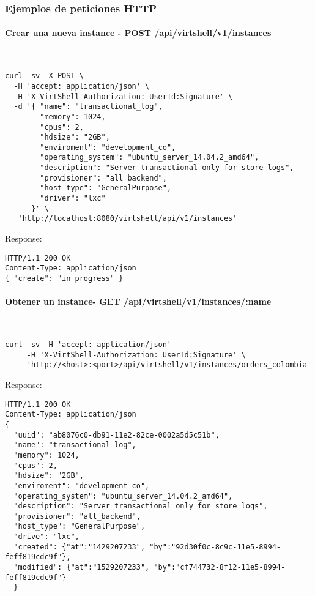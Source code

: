 \subsubsection{Ejemplos de peticiones HTTP}

\paragraph{Crear una nueva instance - POST /api/virtshell/v1/instances} ~\\


\begin{lstlisting}[style=json]
curl -sv -X POST \
  -H 'accept: application/json' \
  -H 'X-VirtShell-Authorization: UserId:Signature' \
  -d '{ "name": "transactional_log",
        "memory": 1024,
        "cpus": 2,
        "hdsize": "2GB",
        "enviroment": "development_co",
        "operating_system": "ubuntu_server_14.04.2_amd64",
        "description": "Server transactional only for store logs", 
        "provisioner": "all_backend",
        "host_type": "GeneralPurpose",
        "driver": "lxc"
      }' \
   'http://localhost:8080/virtshell/api/v1/instances'
\end{lstlisting}

Response:

\begin{lstlisting}[style=json]
HTTP/1.1 200 OK
Content-Type: application/json
{ "create": "in progress" }
\end{lstlisting}

\paragraph{Obtener un instance- GET /api/virtshell/v1/instances/:name} ~\\

\begin{lstlisting}[style=json]
curl -sv -H 'accept: application/json' 
     -H 'X-VirtShell-Authorization: UserId:Signature' \ 
     'http://<host>:<port>/api/virtshell/v1/instances/orders_colombia'
\end{lstlisting}

Response:

\begin{lstlisting}[style=json]
HTTP/1.1 200 OK
Content-Type: application/json
{
  "uuid": "ab8076c0-db91-11e2-82ce-0002a5d5c51b",
  "name": "transactional_log",
  "memory": 1024,
  "cpus": 2,
  "hdsize": "2GB",
  "enviroment": "development_co",
  "operating_system": "ubuntu_server_14.04.2_amd64",
  "description": "Server transactional only for store logs", 
  "provisioner": "all_backend",
  "host_type": "GeneralPurpose",
  "drive": "lxc",
  "created": {"at":"1429207233", "by":"92d30f0c-8c9c-11e5-8994-feff819cdc9f"},
  "modified": {"at":"1529207233", "by":"cf744732-8f12-11e5-8994-feff819cdc9f"}
  }
\end{lstlisting}

